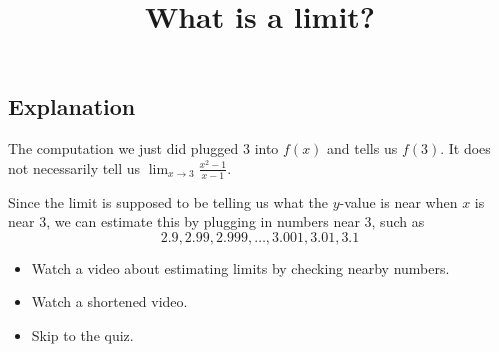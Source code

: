 \documentclass{ximera}
\title{What is a limit?}
\begin{document}
\begin{abstract}
\end{abstract}

\subsection{Explanation}

The computation we just did plugged 3 into $f(x)$ and tells us $f(3)$. It does not necessarily tell us $\lim_{x \to 3} \frac{x^2-1}{x-1}$.

Since the limit is supposed to be telling us what the $y$-value is near when $x$ is near $3$, we can estimate this by plugging in numbers near $3$, such as
\[
    2.9, 2.99, 2.999, \ldots, 3.001, 3.01, 3.1
\]

\begin{itemize}
    \item {} Watch a video about estimating limits by checking nearby numbers.
    \item {} Watch a shortened video.
    \item {} Skip to the quiz.
\end{itemize}
\end{document}
